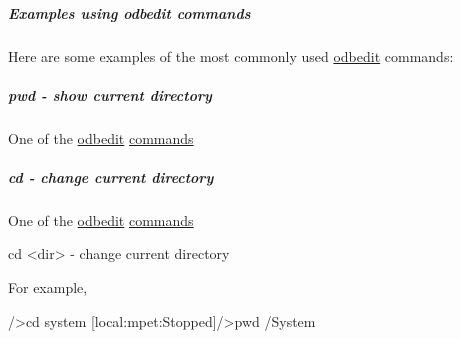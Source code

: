 \hypertarget{RC_odbedit_examples_RC_odbedit_cmd_examples}{}\subparagraph{Examples using odbedit commands}\label{RC_odbedit_examples_RC_odbedit_cmd_examples}
Here are some examples of the most commonly used \hyperlink{RC_odbedit_utility}{odbedit} commands:\hypertarget{RC_odbedit_examples_RC_odbedit_pwd}{}\subparagraph{pwd -\/ show current directory}\label{RC_odbedit_examples_RC_odbedit_pwd}

\footnotesize  One of the \hyperlink{RC_odbedit_utility}{odbedit} \hyperlink{RC_odbedit_utility_RC_odbedit_help}{commands} 
\normalsize \par
\par
 




\hypertarget{RC_odbedit_examples_RC_odbedit_cd}{}\subparagraph{cd -\/ change current directory}\label{RC_odbedit_examples_RC_odbedit_cd}

\footnotesize  One of the \hyperlink{RC_odbedit_utility}{odbedit} \hyperlink{RC_odbedit_utility_RC_odbedit_help}{commands} 
\normalsize \par
\par



\begin{DoxyCode}
cd <dir>                - change current directory
\end{DoxyCode}
 For example, 
\begin{DoxyCode}
/>cd system
[local:mpet:Stopped]/>pwd
/System
\end{DoxyCode}




